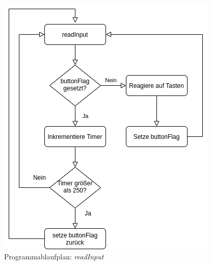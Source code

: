        \begin{figure}[H]
            \centering
            \includegraphics[scale=0.5]{img/entprellung.png}    
            \caption{Programmablaufplan: \textit{readInput}}
        \end{figure}
